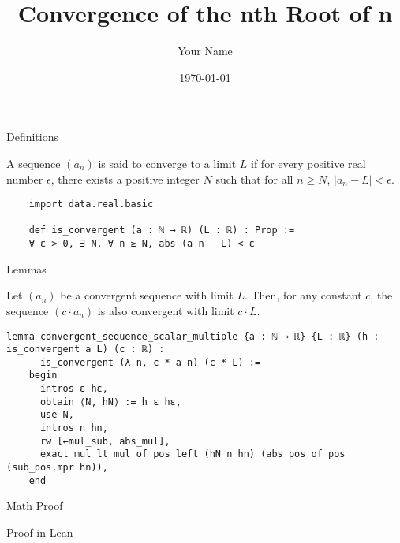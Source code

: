 \documentclass{beamer}
\title{Convergence of the nth Root of n}
\author{Your Name}
\date{\today}
\begin{document}
\begin{frame}
    \titlepage
\end{frame}

\begin{frame}[fragile]{Definitions}
    \begin{definition}
    A sequence $(a_n)$ is said to converge to a limit $L$ if for every positive real number $\epsilon$, there exists a positive integer $N$ such that for all $n \geq N$, $|a_n - L| < \epsilon$.
    \end{definition}

    \begin{lstlisting}
    import data.real.basic

    def is_convergent (a : ℕ → ℝ) (L : ℝ) : Prop :=
    ∀ ε > 0, ∃ N, ∀ n ≥ N, abs (a n - L) < ε
    \end{lstlisting}

\end{frame}

\begin{frame}[fragile]{Lemmas}
    \begin{lemma}
        Let $(a_n)$ be a convergent sequence with limit $L$. Then, for any constant $c$, the sequence $(c \cdot a_n)$ is also convergent with limit $c \cdot L$.
    \end{lemma}

    \begin{lstlisting}[language=lean]
    lemma convergent_sequence_scalar_multiple {a : ℕ → ℝ} {L : ℝ} (h : is_convergent a L) (c : ℝ) :
      is_convergent (λ n, c * a n) (c * L) :=
    begin
      intros ε hε,
      obtain ⟨N, hN⟩ := h ε hε,
      use N,
      intros n hn,
      rw [←mul_sub, abs_mul],
      exact mul_lt_mul_of_pos_left (hN n hn) (abs_pos_of_pos (sub_pos.mpr hn)),
    end
    \end{lstlisting}
\end{frame}

\begin{frame}{Math Proof}
\end{frame}

\begin{frame}{Proof in Lean}
\end{frame}
\end{document}
